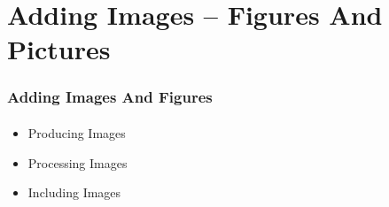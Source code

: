 \section{Adding Images -- Figures And Pictures}



\begin{comment}
*****  [[elisp:(org-cycle)][| ]]  [[elisp:(blee:ppmm:org-mode-toggle)][Nat]] [[elisp:(beginning-of-buffer)][Top]] [[elisp:(delete-other-windows)][(1)]] || /Frame/ *Label=AddingImagesAndFigures*  Adding Images And Figures ::  [[elisp:(org-cycle)][| ]]
\end{comment}

\begin{frame}[fragile,label=AddingImagesAndFigures]
    \frametitle{Adding Images And Figures}
    \framesubtitle{}

    \begin{itemize}
    \item Producing Images
    \item Processing Images      
    \item Including Images
    \end{itemize}

\end{frame}



\begin{comment}
*  [[elisp:(org-cycle)][| ]] [[elisp:(org-show-subtree)][|=]] [[elisp:(show-children 10)][|V]] [[elisp:(bx:orgm:indirectBufOther)][|>]] [[elisp:(bx:orgm:indirectBufMain)][|I]] [[elisp:(blee:ppmm:org-mode-toggle)][|N]] [[elisp:(org-top-overview)][|O]] [[elisp:(progn (org-shifttab) (org-content))][|C]] [[elisp:(delete-other-windows)][|1]]  /Section/   Producing Images ::  [[elisp:(org-cycle)][| ]]
\end{comment}

